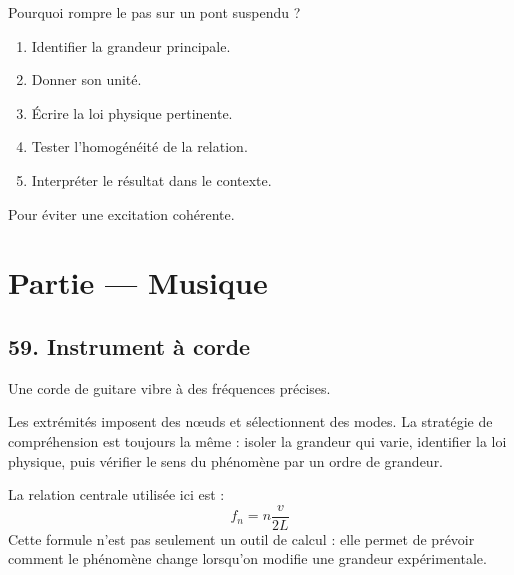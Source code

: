 \documentclass[11pt,a4paper]{article}
\begin{document}
\begin{exercicebox}
Pourquoi rompre le pas sur un pont suspendu ?
\begin{enumerate}
  \item Identifier la grandeur principale.
  \item Donner son unité.
  \item Écrire la loi physique pertinente.
  \item Tester l'homogénéité de la relation.
  \item Interpréter le résultat dans le contexte.
\end{enumerate}
\end{exercicebox}

\begin{corrigebox}[Indication]
Pour éviter une excitation cohérente.
\end{corrigebox}


\section{Partie — Musique}


\subsection{59. Instrument à corde}

\begin{exemplebox}
Une corde de guitare vibre à des fréquences précises.
\end{exemplebox}

\begin{methodebox}
Les extrémités imposent des nœuds et sélectionnent des modes.
La stratégie de compréhension est toujours la même : isoler la grandeur qui varie, identifier la loi physique, puis vérifier le sens du phénomène par un ordre de grandeur.
\end{methodebox}

\begin{theorembox}
La relation centrale utilisée ici est :
\[
f_n=n\frac{v}{2L}
\]
Cette formule n'est pas seulement un outil de calcul : elle permet de prévoir comment le phénomène change lorsqu'on modifie une grandeur expérimentale.
\end{theorembox}
\end{document}
